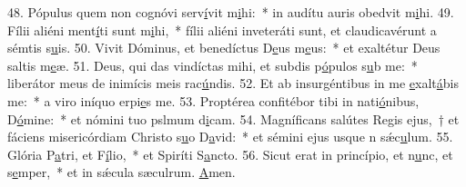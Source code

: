 48. Pópulus quem non cognóvi serv\uline{í}vit m\uline{i}hi:~* in audítu auris obedvit m\uline{i}hi.
49. Fílii aliéni ment\uline{í}ti sunt m\uline{i}hi,~* fílii aliéni inveteráti sunt, et claudicavérunt a sémtis s\uline{u}is.
50. Vivit Dóminus, et benedíctus D\uline{e}us m\uline{e}us:~* et exaltétur Deus saltis m\uline{e}æ.
51. Deus, qui das vindíctas mihi, et subdis p\uline{ó}pulos s\uline{u}b me:~* liberátor meus de inimícis meis rac\uline{ú}ndis.
52. Et ab insurgéntibus in me \uline{e}xalt\uline{á}bis me:~* a viro iníquo erpi\uline{e}s me.
53. Proptérea confitébor tibi in nati\uline{ó}nibus, D\uline{ó}mine:~* et nómini tuo pslmum d\uline{i}cam.
54. Magníficans salútes Regis ejus,~† et fáciens misericórdiam Christo s\uline{u}o D\uline{a}vid:~* et sémini ejus usque n sǽc\uline{u}lum.
55. Glória P\uline{a}tri, et F\uline{í}lio,~* et Spiríti S\uline{a}ncto.
56. Sicut erat in princípio, et n\uline{u}nc, et s\uline{e}mper,~* et in sǽcula sæculrum. \uline{A}men.
